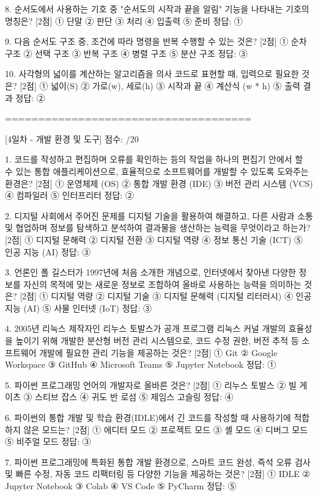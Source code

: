 8. 순서도에서 사용하는 기호 중 "순서도의 시작과 끝을 알림" 기능을 나타내는 기호의 명칭은? [2점]
① 단말
② 판단
③ 처리
④ 입출력
⑤ 준비
정답: ①

9. 다음 순서도 구조 중, 조건에 따라 명령을 반복 수행할 수 있는 것은? [2점]
① 순차 구조
② 선택 구조
③ 반복 구조
④ 병렬 구조
⑤ 분산 구조
정답: ③

10. 사각형의 넓이를 계산하는 알고리즘을 의사 코드로 표현할 때, 입력으로 필요한 것은? [2점]
① 넓이(S)
② 가로(w), 세로(h)
③ 시작과 끝
④ 계산식 (w * h)
⑤ 출력 결과
정답: ②

=====================================

[4일차 - 개발 환경 및 도구]
점수: /20

1. 코드를 작성하고 편집하며 오류를 확인하는 등의 작업을 하나의 편집기 안에서 할 수 있는 통합 애플리케이션으로, 효율적으로 소프트웨어를 개발할 수 있도록 도와주는 환경은? [2점]
① 운영체제 (OS)
② 통합 개발 환경 (IDE)
③ 버전 관리 시스템 (VCS)
④ 컴파일러
⑤ 인터프리터
정답: ②

2. 디지털 사회에서 주어진 문제를 디지털 기술을 활용하여 해결하고, 다른 사람과 소통 및 협업하며 정보를 탐색하고 분석하여 결과물을 생산하는 능력을 무엇이라고 하는가? [2점]
① 디지털 문해력
② 디지털 전환
③ 디지털 역량
④ 정보 통신 기술 (ICT)
⑤ 인공 지능 (AI)
정답: ③

3. 언론인 폴 길스터가 1997년에 처음 소개한 개념으로, 인터넷에서 찾아낸 다양한 정보를 자신의 목적에 맞는 새로운 정보로 조합하여 올바로 사용하는 능력을 의미하는 것은? [2점]
① 디지털 역량
② 디지털 기술
③ 디지털 문해력 (디지털 리터러시)
④ 인공 지능 (AI)
⑤ 사물 인터넷 (IoT)
정답: ③

4. 2005년 리눅스 제작자인 리누스 토발스가 공개 프로그램 리눅스 커널 개발의 효율성을 높이기 위해 개발한 분산형 버전 관리 시스템으로, 코드 수정 권한, 버전 추적 등 소프트웨어 개발에 필요한 관리 기능을 제공하는 것은? [2점]
① Git
② Google Workspace
③ GitHub
④ Microsoft Teams
⑤ Jupyter Notebook
정답: ①

5. 파이썬 프로그래밍 언어의 개발자로 올바른 것은? [2점]
① 리누스 토발스
② 빌 게이츠
③ 스티브 잡스
④ 귀도 반 로섬
⑤ 제임스 고슬링
정답: ④

6. 파이썬의 통합 개발 및 학습 환경(IDLE)에서 긴 코드를 작성할 때 사용하기에 적합하지 않은 모드는? [2점]
① 에디터 모드
② 프로젝트 모드
③ 셸 모드
④ 디버그 모드
⑤ 비주얼 모드
정답: ③

7. 파이썬 프로그래밍에 특화된 통합 개발 환경으로, 스마트 코드 완성, 즉석 오류 검사 및 빠른 수정, 자동 코드 리팩터링 등 다양한 기능을 제공하는 것은? [2점]
① IDLE
② Jupyter Notebook
③ Colab
④ VS Code
⑤ PyCharm
정답: ⑤

